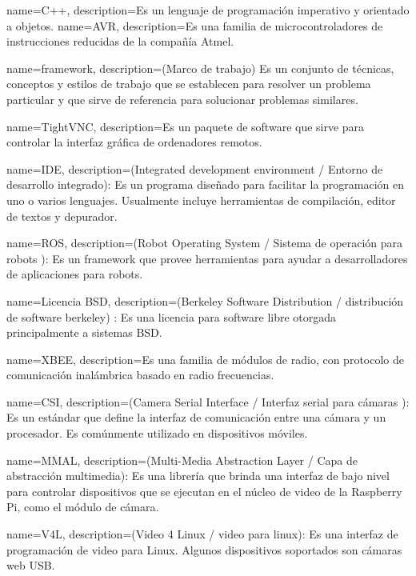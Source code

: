 {
  name=C++,
  description={Es un lenguaje de programaci\'on imperativo y orientado a objetos.}
}
{
  name=AVR,
  description={Es una familia de microcontroladores de instrucciones reducidas de la compañía Atmel.}
}

{
  name=framework,
  description={(Marco de trabajo) Es un conjunto de técnicas, conceptos y estilos de trabajo que se establecen para resolver un problema particular y que sirve de referencia para solucionar problemas similares.}
}

{
  name=TightVNC,
  description={Es un paquete de software que sirve para controlar la interfaz gráfica  de ordenadores remotos.}
}

{
  name=IDE,
  description={(Integrated development environment / Entorno de desarrollo integrado): Es un programa diseñado para facilitar la programación en uno o varios lenguajes. Usualmente incluye herramientas de compilación, editor de textos y depurador.}
}

{
  name=ROS,
  description={(Robot Operating System / Sistema de operación para robots ): Es un framework que provee herramientas para ayudar a desarrolladores de aplicaciones para robots.}
}

{
  name=Licencia BSD,
  description={(Berkeley Software Distribution / distribución de software berkeley) : Es una licencia para software libre otorgada principalmente a sistemas BSD.}
}

{
  name=XBEE,
  description={Es una familia de módulos de radio, con protocolo de comunicación inalámbrica basado en radio frecuencias.}
}

{
  name=CSI,
  description={(Camera Serial Interface / Interfaz serial para cámaras ): Es un estándar que define la interfaz de comunicación entre una cámara y un procesador. Es comúnmente utilizado en dispositivos móviles.}
}
     
{
  name=MMAL,
  description={(Multi-Media Abstraction Layer / Capa de abstracción multimedia): Es una librería que brinda una interfaz de bajo nivel para controlar dispositivos que se ejecutan en el núcleo de video de la Raspberry Pi, como el módulo de cámara.}
}
 
{
  name=V4L,
  description={(Video 4 Linux / video para linux): Es una interfaz de programación de video para Linux. Algunos dispositivos soportados son cámaras web USB.}
}

